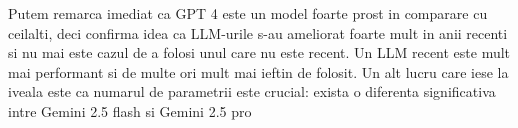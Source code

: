 \documentclass[12pt, a4paper]{report}
\begin{document}
Putem remarca imediat ca GPT 4 este un model foarte prost in comparare cu ceilalti, deci confirma idea ca LLM-urile s-au ameliorat foarte mult in anii recenti 
si nu mai este cazul de a folosi unul care nu este recent. Un LLM recent este mult mai performant si de multe ori mult mai ieftin de folosit.
Un alt lucru care iese la iveala este ca numarul de parametrii este crucial: exista o diferenta significativa intre Gemini 2.5 flash si Gemini 2.5 pro


\printbibliography[heading=bibintoc]
\end{document}

